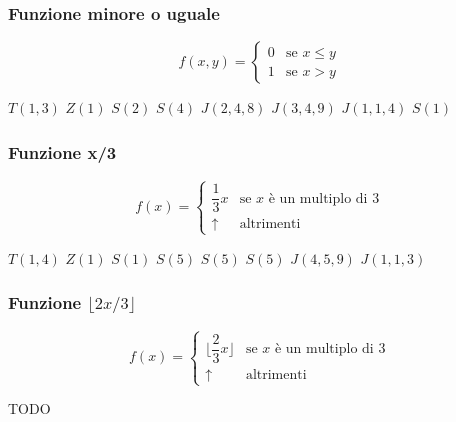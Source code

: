 \subsubsection{Funzione minore o uguale}
$$
f(x, y) = \begin{cases}
	0 & \text{se } x\leq y\\
	1 & \text{se } x> y
\end{cases}
$$

\begin{algorithm}[H]
	\caption{Funzione minore o uguale}
	\begin{algorithmic}[1]
		\State $T(1,3)$
		\State $Z(1)$
		\State $S(2)$
		\State $S(4)$
		\State $J(2,4,8)$
		\State $J(3,4,9)$
		\State $J(1,1,4)$
		\State $S(1)$
	\end{algorithmic}
\end{algorithm}

\subsubsection{Funzione x/3}
$$
f(x) =
\begin{cases}
	\dfrac{1}{3}x & \text{se } x \text{ è un multiplo di } 3 \\[6pt]
	\uparrow & \text{altrimenti}
\end{cases}
$$

\begin{algorithm}[H]
	\caption{Funzione $x/3$}
	\begin{algorithmic}[1]
		\State $T(1,4)$
		\State $Z(1)$
		\State $S(1)$
		\State $S(5)$
		\State $S(5)$
		\State $S(5)$
		\State $J(4,5,9)$
		\State $J(1,1,3)$
	\end{algorithmic}
\end{algorithm}

\subsubsection{Funzione $\lfloor 2x/3 \rfloor$}
$$
f(x) =
\begin{cases}
	\lfloor\dfrac{2}{3}x\rfloor & \text{se } x \text{ è un multiplo di } 3 \\[6pt]
	\uparrow & \text{altrimenti}
\end{cases}
$$

\begin{algorithm}[H]
	\caption{Funzione $\lfloor 2x/3 \rfloor$}
	\begin{algorithmic}[1]
	\State TODO
	\end{algorithmic}
\end{algorithm}
